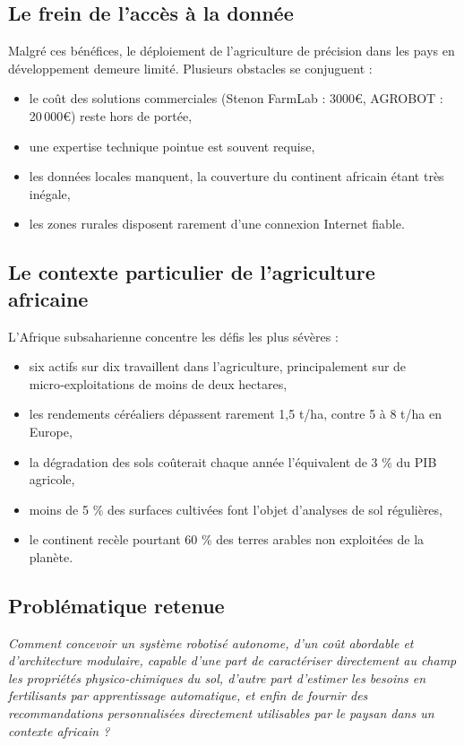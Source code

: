 \documentclass[a4paper,12pt,openany,titlepage]{scrartcl}
\begin{document}
\subsection{Le frein de l’accès à la donnée}

Malgré ces bénéfices, le déploiement de l’agriculture de précision dans les pays en développement demeure limité. Plusieurs obstacles se conjuguent :
\begin{itemize}[nosep]
    \item le coût des solutions commerciales (Stenon FarmLab : 3000\euro, AGROBOT : 20\,000\euro) reste hors de portée,
    \item une expertise technique pointue est souvent requise,
    \item les données locales manquent, la couverture du continent africain étant très inégale,
    \item les zones rurales disposent rarement d’une connexion Internet fiable.
\end{itemize}

\subsection{Le contexte particulier de l’agriculture africaine}

L’Afrique subsaharienne concentre les défis les plus sévères :
\begin{itemize}[nosep]
    \item six actifs sur dix travaillent dans l’agriculture, principalement sur de micro‑exploitations de moins de deux hectares,
    \item les rendements céréaliers dépassent rarement 1,5 t/ha, contre 5 à 8 t/ha en Europe,
    \item la dégradation des sols coûterait chaque année l’équivalent de 3 \% du PIB agricole,
    \item moins de 5 \% des surfaces cultivées font l’objet d’analyses de sol régulières,
    \item le continent recèle pourtant 60 \% des terres arables non exploitées de la planète.
\end{itemize}

\subsection{Problématique retenue}

\begin{center}
\textit{Comment concevoir un système robotisé autonome, d’un coût abordable et d’architecture modulaire, capable d’une part de caractériser directement au champ les propriétés physico‑chimiques du sol, d’autre part d’estimer les besoins en fertilisants par apprentissage automatique, et enfin de fournir des recommandations personnalisées directement utilisables par le paysan dans un contexte africain ?}
\end{center}
\end{document}
